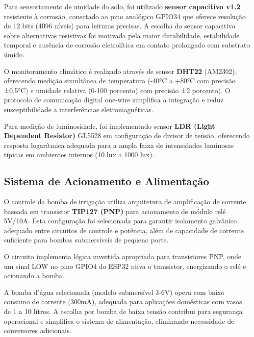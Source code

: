 \documentclass[twoside,english,brazilian]{UNISINOSmonografia}
\begin{document}
Para sensoriamento de umidade do solo, foi utilizado \textbf{sensor capacitivo v1.2} resistente à corrosão, conectado ao pino analógico GPIO34 que oferece resolução de 12 bits (4096 níveis) para leituras precisas. A escolha do sensor capacitivo sobre alternativas resistivas foi motivada pela maior durabilidade, estabilidade temporal e ausência de corrosão eletrolítica em contato prolongado com substrato úmido.

O monitoramento climático é realizado através de sensor \textbf{DHT22} (AM2302), oferecendo medição simultânea de temperatura (-40°C a +80°C com precisão ±0.5°C) e umidade relativa (0-100 porcento) com precisão ±2 porcento). O protocolo de comunicação digital one-wire simplifica a integração e reduz susceptibilidade a interferências eletromagnéticas.

Para medição de luminosidade, foi implementado sensor \textbf{LDR (Light Dependent Resistor)} GL5528 em configuração de divisor de tensão, oferecendo resposta logarítmica adequada para a ampla faixa de intensidades luminosas típicas em ambientes internos (10 lux a 1000 lux).

\subsection{Sistema de Acionamento e Alimentação}

O controle da bomba de irrigação utiliza arquitetura de amplificação de corrente baseada em transistor \textbf{TIP127 (PNP)} para acionamento de módulo relé 5V/10A. Esta configuração foi selecionada para garantir isolamento galvânico adequado entre circuitos de controle e potência, além de capacidade de corrente suficiente para bombas submersíveis de pequeno porte.


O circuito implementa lógica invertida apropriada para transistores PNP, onde um sinal LOW no pino GPIO4 do ESP32 ativa o transistor, energizando o relé e acionando a bomba. 

A bomba d'água selecionada (modelo submersível 3-6V) opera com baixo consumo de corrente (300mA), adequada para aplicações domésticas com vasos de 1 a 10 litros. A escolha por bomba de baixa tensão contribui para segurança operacional e simplifica o sistema de alimentação, eliminando necessidade de conversores adicionais.
\end{document}
